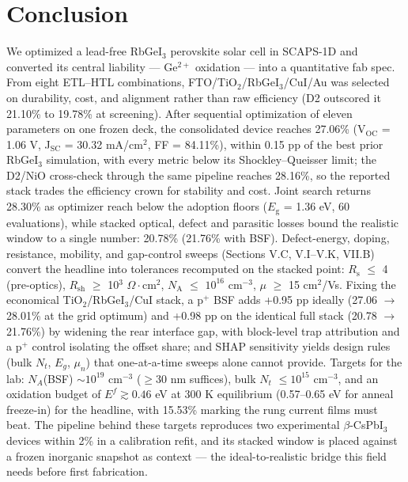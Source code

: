 \documentclass[aip,amsmath,amssymb,preprint]{revtex4-2}
\begin{document}
\section{Conclusion}
We optimized a lead-free RbGeI$_{3}$ perovskite solar cell in SCAPS-1D and converted its central liability --- Ge$^{2+}$ oxidation --- into a quantitative fab spec. From eight ETL--HTL combinations, FTO/\allowbreak{}TiO$_{2}$/RbGeI$_{3}$/CuI/\allowbreak{}Au was selected on durability, cost, and alignment rather than raw efficiency (D2 outscored it 21.10\% to 19.78\% at screening).
After sequential optimization of eleven parameters on one frozen deck, the consolidated device reaches 27.06\% (V$_{\mathrm{OC}}$ = 1.06 V, J$_{\mathrm{SC}}$ = 30.32 mA/cm$^{2}$, FF = 84.11\%), within 0.15 pp of the best prior RbGeI$_{3}$ simulation, with every metric below its Shockley--Queisser limit; the D2/NiO cross-check through the same pipeline reaches 28.16\%, so the reported stack trades the efficiency crown for stability and cost. Joint search returns 28.30\% as optimizer reach below the adoption floors ($E_{\mathrm{g}}$ = 1.36 eV, 60 evaluations), while stacked optical, defect and parasitic losses bound the realistic window to a single number: 20.78\% (21.76\% with BSF). Defect-energy, doping, resistance, mobility, and gap-control sweeps (Sections V.C, V.I--V.K, VII.B) convert the headline into tolerances recomputed on the stacked point: $R_{\mathrm{s}}$ $\le$ 4 (pre-optics), $R_{\mathrm{sh}}$ $\ge$ 10$^{3}$ $\Omega\cdot$cm$^{2}$, $N_{\mathrm{A}}$ $\le$ $10^{16}$ cm$^{-3}$, $\mu$ $\ge$ 15 cm$^{2}$/Vs. Fixing the economical TiO$_{2}$/RbGeI$_{3}$/CuI stack, a p$^{+}$ BSF adds +0.95 pp ideally (27.06 $\rightarrow$ 28.01\% at the grid optimum) and +0.98 pp on the identical full stack (20.78 $\rightarrow$ 21.76\%) by widening the rear interface gap, with block-level trap attribution and a p$^{+}$ control isolating the offset share; and SHAP sensitivity yields design rules (bulk $N_{t}$, $E_{g}$, $\mu_{n}$) that one-at-a-time sweeps alone cannot provide. Targets for the lab: $N_{A}$(BSF) $\sim$$10^{19}$ cm$^{-3}$ ($\ge$30 nm suffices), bulk $N_{t}$ $\le$$10^{15}$ cm$^{-3}$, and an oxidation budget of $E^f\gtrsim0.46$ eV at 300 K equilibrium (0.57--0.65 eV for anneal freeze-in) for the headline, with 15.53\% marking the rung current films must beat. The pipeline behind these targets reproduces two experimental $\beta$-CsPbI$_{3}$ devices within 2\% in a calibration refit, and its stacked window is placed against a frozen inorganic snapshot as context --- the ideal-to-realistic bridge this field needs before first fabrication.
\end{document}
